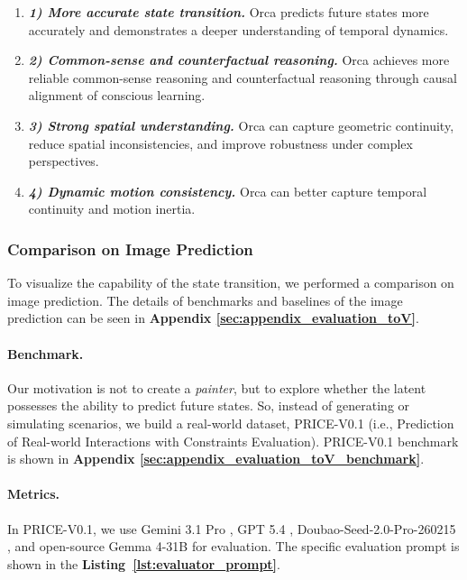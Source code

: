 \documentclass{llmxive}
\begin{document}
\vspace{-1ex}
\begin{enumerate}[
    leftmargin=1.35em,
    itemsep=0.35em,
    topsep=0.35em,
    parsep=0em
]
    \item[] \textbf{\textit{1) More accurate state transition.}} 
    Orca predicts future states more accurately and demonstrates a deeper understanding of temporal dynamics.
    
    \item[] \textbf{\textit{2) Common-sense and counterfactual reasoning.}}
    Orca achieves more reliable common-sense reasoning and counterfactual reasoning through causal alignment of conscious learning.
    
    \item[] \textbf{\textit{3) Strong spatial understanding.}}
    Orca can capture geometric continuity, reduce spatial inconsistencies, and improve robustness under complex perspectives.

    \item[] \textbf{\textit{4) Dynamic motion consistency.}}
    Orca can better capture temporal continuity and motion inertia.
\end{enumerate}






\subsubsection{Comparison on Image Prediction}\label{sec:evaluation_toV}



To visualize the capability of the state transition, we performed a comparison on image prediction. The details of benchmarks and baselines of the image prediction can be seen in \textbf{Appendix \ref{sec:appendix_evaluation_toV}}.

\paragraph{Benchmark.} Our motivation is not to create a \textit{painter}, but to explore whether the latent possesses the ability to predict future states. So, instead of generating or simulating scenarios, we build a real-world dataset, PRICE-V0.1 (i.e., Prediction of Real-world Interactions with Constraints Evaluation). 
PRICE-V0.1  benchmark is shown in \textbf{Appendix \ref{sec:appendix_evaluation_toV_benchmark}}. 

\paragraph{Metrics.} In PRICE-V0.1, we use Gemini 3.1 Pro \citep{Gemini-3.1-pro}, GPT 5.4 \citep{GPT54}, Doubao-Seed-2.0-Pro-260215 \citep{doubao-seed-2.0-pro}, and open-source Gemma 4-31B \citep{Gemma4} for evaluation. The specific evaluation prompt is shown in the \textbf{Listing~\ref{lst:evaluator_prompt}}. 
\end{document}
